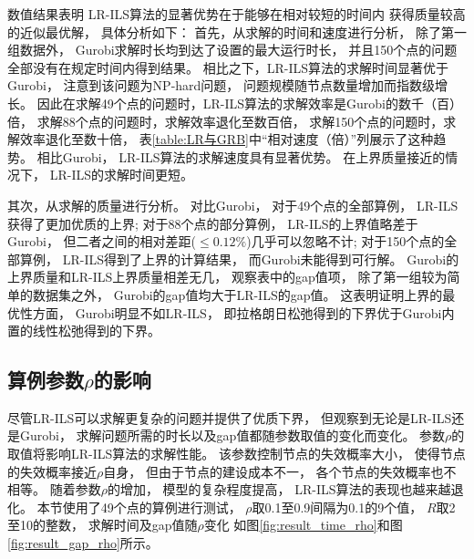 数值结果表明
LR-ILS算法的显著优势在于能够在相对较短的时间内
获得质量较高的近似最优解，
具体分析如下：
首先，从求解的时间和速度进行分析，
除了第一组数据外，
Gurobi求解时长均到达了设置的最大运行时长，
并且150个点的问题全部没有在规定时间内得到结果。
相比之下，LR-ILS算法的求解时间显著优于Gurobi，
注意到该问题为NP-hard问题，
问题规模随节点数量增加而指数级增长。
因此在求解49个点的问题时，LR-ILS算法的求解效率是Gurobi的数千（百）倍，
求解88个点的问题时，求解效率退化至数百倍，
求解150个点的问题时，求解效率退化至数十倍，
表\ref{table:LR与GRB}中``相对速度（倍）''列展示了这种趋势。
相比Gurobi，
LR-ILS算法的求解速度具有显著优势。
在上界质量接近的情况下，
LR-ILS的求解时间更短。

其次，从求解的质量进行分析。
对比Gurobi，
对于49个点的全部算例，
LR-ILS获得了更加优质的上界;
对于88个点的部分算例，
LR-ILS的上界值略差于Gurobi，
但二者之间的相对差距($\le 0.12\%$)几乎可以忽略不计;
对于150个点的全部算例，
LR-ILS得到了上界的计算结果，
而Gurobi未能得到可行解。
Gurobi的上界质量和LR-ILS上界质量相差无几，
观察表中的gap值项，
除了第一组较为简单的数据集之外，
Gurobi的gap值均大于LR-ILS的gap值。
这表明证明上界的最优性方面，
Gurobi明显不如LR-ILS，
即拉格朗日松弛得到的下界优于Gurobi内置的线性松弛得到的下界。

\subsection{算例参数\texorpdfstring{$\rho$}{p}的影响}
尽管LR-ILS可以求解更复杂的问题并提供了优质下界，
但观察到无论是LR-ILS还是Gurobi，
求解问题所需的时长以及gap值都随参数取值的变化而变化。
参数$\rho$的取值将影响LR-ILS算法的求解性能。
该参数控制节点的失效概率大小，
使得节点的失效概率接近$\rho$自身，
但由于节点的建设成本不一，
各个节点的失效概率也不相等。
随着参数$\rho$的增加，
模型的复杂程度提高，
LR-ILS算法的表现也越来越退化。
本节使用了49个点的算例进行测试，
$\rho$取0.1至0.9间隔为0.1的9个值，
$R$取2至10的整数，
求解时间及gap值随$\rho$变化
如图\ref{fig:result_time_rho}和图\ref{fig:result_gap_rho}所示。


